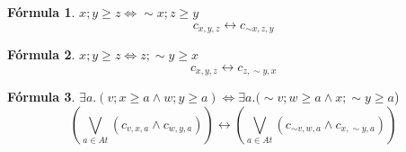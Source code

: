 \documentclass{article}
\theoremstyle{definition}
\newtheorem*{formula}{Fórmula}
\begin{document}
\begin{formula} $x;y \geq z \Leftrightarrow \sim x ; z \geq y$
\[ 
    c_{x,y,z} \leftrightarrow c_{\sim x, z, y}
\]
\end{formula}
\begin{formula} $x;y \geq z \Leftrightarrow z ; \sim y \geq x$
\[ 
    c_{x,y,z} \leftrightarrow c_{z,\sim y,x}
\]
\end{formula}

\begin{formula} $\exists a. (v;x \geq a \land w;y \geq a) \Leftrightarrow \exists a. (\sim v;w \geq a \land x;\sim y \geq a$)
\[
    (\bigvee_{a \in At} (c_{v,x,a} \land c_{w,y,a})) \leftrightarrow (\bigvee_{a \in At} (c_{\sim v,w,a} \land c_{x,\sim y,a}))
\] 
\end{formula}
\end{document}
